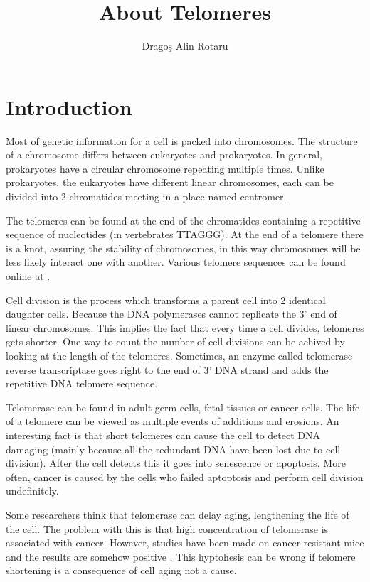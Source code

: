 \documentclass{llncs}
\begin{document}
\pagestyle{empty}
\title{About Telomeres}

\author{Drago\c{s} Alin Rotaru}
\maketitle

\section{Introduction}

Most of genetic information for a cell is packed into chromosomes. The structure of a chromosome differs between eukaryotes and prokaryotes. In general, prokaryotes have a circular chromosome repeating multiple times.
Unlike prokaryotes, the eukaryotes have different linear chromosomes, each can be divided into 2 chromatides meeting in a place named centromer.

The telomeres can be found at the end of the chromatides containing a repetitive sequence of nucleotides (in vertebrates TTAGGG). At the end of a telomere there is a knot, assuring the stability of chromosomes, in this way chromosomes will be less likely interact one with another.
Various telomere sequences can be found online at \cite{website:database}.

Cell division is the process which transforms a parent cell into 2 identical daughter cells. Because the DNA polymerases cannot replicate the 3' end of linear chromosomes. This implies the fact that every time a cell divides, telomeres gets shorter. One way to count the number of cell divisions can be achived by looking at the length of the telomeres. Sometimes, an enzyme called telomerase reverse transcriptase goes right to the end of 3' DNA strand and adds the repetitive DNA telomere sequence.

Telomerase can be found in adult germ cells, fetal tissues or cancer cells. The life of a telomere can be viewed as multiple events of additions and erosions.
An interesting fact is that short telomeres can cause the cell to detect DNA damaging (mainly because all the redundant DNA have been lost due to cell division). After the cell detects this it goes into senescence or apoptosis. More often, cancer is caused by the cells who failed aptoptosis and perform cell division undefinitely.

Some researchers think that telomerase can delay aging, lengthening the life of the cell. The problem with this is that high concentration of telomerase is associated with cancer. However, studies have been made on cancer-resistant mice and the results are somehow positive \cite{tomas:2008}. This hyptohesis can be wrong if telomere shortening is a consequence of cell aging not a cause.
\end{document}
